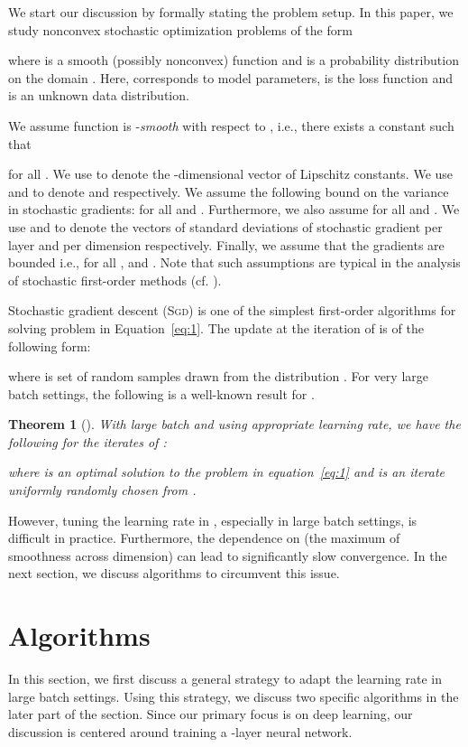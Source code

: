 \documentclass{article} \usepackage{iclr2020_conference,times}
\def\eqref#1{equation~\ref{#1}}
\newtheorem{theorem}{Theorem}
\newcommand{\sgd}{\textsc{Sgd}\xspace}
\begin{document}
We start our discussion by formally stating the problem setup.  In this paper, we study nonconvex stochastic optimization problems of the form

where  is a smooth (possibly nonconvex) function and  is a probability distribution on the domain . 
Here,  corresponds to model parameters,  is the loss function and  is an unknown data distribution. 

We assume function  is -\emph{smooth} with respect to , i.e.,  there exists a constant  such that

for all . We use  to denote the -dimensional vector of Lipschitz constants. 
We use  and  to denote  and  respectively.  We assume the following bound on the variance in stochastic gradients:  for all  and .    
Furthermore, we also assume  for all  and .  
We use  and  to denote the vectors of standard deviations of stochastic gradient per layer and per dimension respectively.  
Finally, we assume that the gradients are bounded i.e.,  for all ,  and . 
Note that such assumptions are typical in the analysis of stochastic first-order methods (cf. \citep{Ghadimi13,Ghadimi14}). 

Stochastic gradient descent (\sgd) is one of the simplest first-order algorithms for solving problem in Equation~\ref{eq:1}. The update at the  iteration of  is of the following form:

where  is set of  random samples drawn from the  distribution . For very large batch settings, the following is a well-known result for .
\begin{theorem}[\citep{ghadimi2013stochastic}]
With large batch  and using appropriate learning rate, we have the following for the iterates of :

where  is an optimal solution to the problem in \eqref{eq:1} and  is an iterate uniformly randomly chosen from .
\label{thm:sgd-conv}
\end{theorem}
However, tuning the learning rate  in , especially in large batch settings, is difficult in practice. Furthermore, the dependence on  (the maximum of smoothness across dimension) can lead to significantly slow convergence. In the next section, we discuss algorithms to circumvent this issue.  
\section{Algorithms}


In this section, we first discuss a general strategy to adapt the learning rate in large batch settings.  Using this strategy, we discuss two specific algorithms in the later part of the section. Since our primary focus is on deep learning, our discussion is centered around training a -layer neural network.
\end{document}
